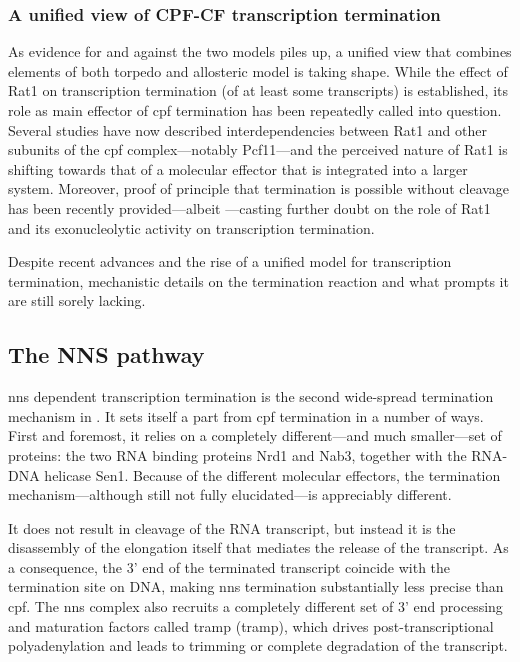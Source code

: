 \subsubsection{A unified view of CPF-CF transcription termination}

As evidence for and against the two models piles up, a unified view that combines elements of both torpedo and allosteric model is taking shape.
While the effect of Rat1 on transcription termination (of at least some transcripts) is established, its role as main effector of \gls{cpf} termination has been repeatedly called into question.
Several studies have now described interdependencies between Rat1 and other subunits of the \gls{cpf} complex---notably Pcf11---and the perceived nature of Rat1 is shifting towards that of a molecular effector  that is integrated into a larger system.
Moreover, proof of principle that termination is possible without cleavage has been recently provided---albeit \invitro{}---casting further doubt on the role of Rat1 and its exonucleolytic activity on transcription termination.

Despite recent advances and the rise of a unified model for transcription termination, mechanistic details on the termination reaction and what prompts it are still sorely lacking.



\subsection{The NNS pathway}

\gls{nns} dependent transcription termination is the second wide-spread termination mechanism in \cer{}.
It sets itself a part from \gls{cpf} termination in a number of ways.
First and foremost, it relies on a completely different---and much smaller---set of proteins: the two RNA binding proteins Nrd1 and Nab3, together with the RNA-DNA helicase Sen1.
Because of the different molecular effectors, the termination mechanism---although still not fully elucidated---is appreciably different.

It does not result in cleavage of the RNA transcript, but instead it is the disassembly of the elongation itself that mediates the release of the transcript. 
As a consequence, the 3' end of the terminated transcript coincide with the termination site on DNA, making \gls{nns} termination substantially less precise than \gls{cpf}.
The \gls{nns} complex also recruits a completely different set of 3' end processing and maturation factors called \gls{tramp} (\glsdesc{tramp}), which drives post-transcriptional polyadenylation and leads to trimming or complete degradation of the transcript. 

